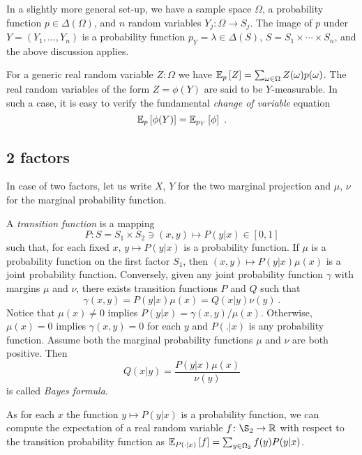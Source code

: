 \documentclass[12pt,a4paper]{amsart}
\theoremstyle{plain}%
\theoremstyle{definition}
\theoremstyle{remark}
\begin{document}
In a slightly more general set-up, we have a sample space $\Omega$, a
probability function $p \in \Delta(\Omega)$, and $n$ random variables
$Y_j \colon \Omega \to S_j$. The image of $p$ under $Y =
(Y_1,\dots,Y_n)$ is a probability function $p_Y = \lambda \in
\Delta(S)$, $S=S_1 \times \cdots \times S_n$, and the above discussion
applies.

For a generic real random variable $Z \colon \Omega$ we have
$\operatorname{\mathbb E}_{p}\left[Z\right] = \sum_{\omega\in\Omega} Z(\omega)p(\omega)$. The real
random variables of the form $Z = \phi(Y)$ are said to be
$Y$-measurable. In such a case, it is easy to verify the fundamental
\emph{change of variable} equation
\begin{equation*}
  \operatorname{\mathbb E}_{p}\left[\phi(Y)\right] = \operatorname{\mathbb E}_{p_Y}\left[\phi\right] \ .
\end{equation*}

\subsection{2 factors}

In case of two factors, let us write $X$, $Y$ for the two marginal
projection and $\mu$, $\nu$ for the marginal probability function.

A \emph{transition function} is a mapping
\begin{equation*}
  P \colon S = S_1 \times S_2 \ni (x,y) \mapsto P(y|x) \in [0,1]
\end{equation*}
such that, for each fixed $x$, $y \mapsto P(y|x)$ is a probability function. If $\mu$ is a probability function on the first factor $S_1$, then $(x,y) \mapsto P(y|x)\mu(x)$  is a joint probability function. Conversely, given any joint probability function $\gamma$ with margins $\mu$ and $\nu$, there exists transition functions $P$ and $Q$ such that
\begin{equation*}
  \gamma(x,y) = P(y|x)\mu(x) = Q(x|y)\nu(y) \ .
\end{equation*}
Notice that $\mu(x) \neq 0$ implies $P(y|x) = \gamma(x,y)/\mu(x)$. Otherwise, $\mu(x)=0$ implies $\gamma(x,y) = 0$ for each $y$ and $P(.|x)$ is any probability function. Assume both the marginal probability functions $\mu$ and $\nu$ are both positive. Then
\begin{equation*}
  Q(x|y) = \frac {P(y|x)\mu(x)}{\nu(y)}
\end{equation*}
is called \emph{Bayes formula}.

As for each $x$ the function $y \mapsto P(y|x)$ is a probability
function, we can compute the expectation of a real random variable $f
\colon \S_2 \to \reals$ with respect to the transition probability
function as $\operatorname{\mathbb E}_{P(\cdot|x)}\left[f\right] = \sum_{y\in\Omega_2} f(y)
P(y|x)$.
\end{document}
